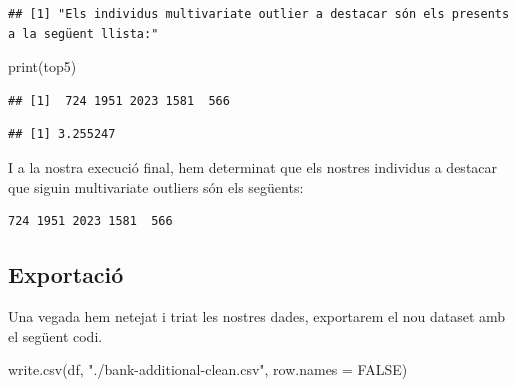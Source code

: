 \documentclass[
]{article}
\newenvironment{Shaded}{\begin{snugshade}}{\end{snugshade}}
\newcommand{\AttributeTok}[1]{\textcolor[rgb]{0.77,0.63,0.00}{#1}}
\newcommand{\ConstantTok}[1]{\textcolor[rgb]{0.00,0.00,0.00}{#1}}
\newcommand{\FunctionTok}[1]{\textcolor[rgb]{0.00,0.00,0.00}{#1}}
\newcommand{\NormalTok}[1]{#1}
\newcommand{\SpecialCharTok}[1]{\textcolor[rgb]{0.00,0.00,0.00}{#1}}
\newcommand{\StringTok}[1]{\textcolor[rgb]{0.31,0.60,0.02}{#1}}
\begin{document}
\begin{verbatim}
## [1] "Els individus multivariate outlier a destacar són els presents a la següent llista:"
\end{verbatim}

\begin{Shaded}
\begin{Highlighting}[]
\FunctionTok{print}\NormalTok{(top5)}
\end{Highlighting}
\end{Shaded}

\begin{verbatim}
## [1]  724 1951 2023 1581  566
\end{verbatim}

\begin{Shaded}
\end{Shaded}

\begin{verbatim}
## [1] 3.255247
\end{verbatim}

I a la nostra execució final, hem determinat que els nostres individus a
destacar que siguin multivariate outliers són els següents:

\begin{verbatim}
724 1951 2023 1581  566
\end{verbatim}

\hypertarget{exportaciuxf3}{%
\subsection{Exportació}\label{exportaciuxf3}}

Una vegada hem netejat i triat les nostres dades, exportarem el nou
dataset amb el següent codi.

\begin{Shaded}
\begin{Highlighting}[]
\FunctionTok{write.csv}\NormalTok{(df, }\StringTok{"./bank{-}additional{-}clean.csv"}\NormalTok{, }\AttributeTok{row.names =} \ConstantTok{FALSE}\NormalTok{)}
\end{Highlighting}
\end{Shaded}
\end{document}
